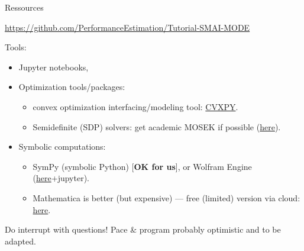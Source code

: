 \documentclass[aspectratio=169]{beamer}
\begin{document}
\begin{frame}{Ressources}

\begin{center}
	\url{https://github.com/PerformanceEstimation/Tutorial-SMAI-MODE}
\end{center}


\bigskip
Tools:
\begin{itemize}
	\item Jupyter notebooks,
	\item Optimization tools/packages:
	\begin{itemize}
		\item convex optimization interfacing/modeling tool: \href{https://www.cvxpy.org/}{CVXPY}.
		\item Semidefinite (SDP) solvers: get academic MOSEK if possible (\href{https://www.mosek.com/products/academic-licenses/}{here}).
	\end{itemize}
	\item Symbolic computations:
	\begin{itemize}
		\item SymPy (symbolic Python) [\textbf{OK for us}], or Wolfram Engine (\href{https://www.wolfram.com/engine/}{here}+jupyter).
		\item Mathematica is better (but expensive) --- free (limited) version via cloud: \href{https://www.wolframcloud.com/}{here}.
	\end{itemize}
\end{itemize}

\bigskip
Do interrupt with questions! Pace \& program probably optimistic and to be adapted.

\end{frame}
\end{document}

